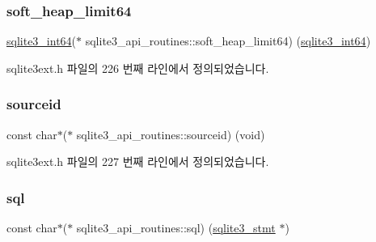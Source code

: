 \mbox{\label{structsqlite3__api__routines_ab3c891f0430b0a79449e16553fe2f7eb}} 
\subsubsection{\texorpdfstring{soft\+\_\+heap\+\_\+limit64}{soft\_heap\_limit64}}
{\footnotesize\ttfamily \hyperlink{sqlite3_8h_a0a4d3e6c1ad46f90e746b920ab6ca0d2}{sqlite3\+\_\+int64}($\ast$ sqlite3\+\_\+api\+\_\+routines\+::soft\+\_\+heap\+\_\+limit64) (\hyperlink{sqlite3_8h_a0a4d3e6c1ad46f90e746b920ab6ca0d2}{sqlite3\+\_\+int64})}



sqlite3ext.\+h 파일의 226 번째 라인에서 정의되었습니다.

\mbox{\label{structsqlite3__api__routines_ad1314899ed69b8d423c6418b51e9c0ba}} 
\subsubsection{\texorpdfstring{sourceid}{sourceid}}
{\footnotesize\ttfamily const char$\ast$($\ast$ sqlite3\+\_\+api\+\_\+routines\+::sourceid) (void)}



sqlite3ext.\+h 파일의 227 번째 라인에서 정의되었습니다.

\mbox{\label{structsqlite3__api__routines_a0d4c8662baae0bd626f0ee334183e69e}} 
\subsubsection{\texorpdfstring{sql}{sql}}
{\footnotesize\ttfamily const char$\ast$($\ast$ sqlite3\+\_\+api\+\_\+routines\+::sql) (\hyperlink{sqlite3_8h_af2a033da1327cdd77f0a174a09aedd0c}{sqlite3\+\_\+stmt} $\ast$)}



